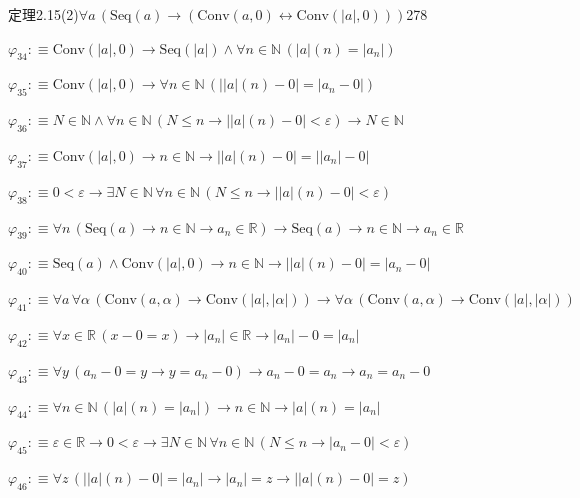 \begin{fullproof}{定理2.15(2)}{$\forall a\,(\mathrm{Seq}(a) \to (\mathrm{Conv}(a,0) \leftrightarrow \mathrm{Conv}(\lvert a \rvert,0)))$}{278}
\begin{abbrevlist}
\item $\varphi_{34} :\equiv \mathrm{Conv}(\lvert a \rvert,0) \to \mathrm{Seq}(\lvert a \rvert) \land \forall n \in \mathbb{N}\,(\lvert a \rvert(n) = \lvert a_{n} \rvert)$
\item $\varphi_{35} :\equiv \mathrm{Conv}(\lvert a \rvert,0) \to \forall n \in \mathbb{N}\,(\lvert \lvert a \rvert(n) - 0 \rvert = \lvert a_{n} - 0 \rvert)$
\item $\varphi_{36} :\equiv N \in \mathbb{N} \land \forall n \in \mathbb{N}\,(N \leq n \to \lvert \lvert a \rvert(n) - 0 \rvert < \varepsilon) \to N \in \mathbb{N}$
\item $\varphi_{37} :\equiv \mathrm{Conv}(\lvert a \rvert,0) \to n \in \mathbb{N} \to \lvert \lvert a \rvert(n) - 0 \rvert = \lvert \lvert a_{n} \rvert - 0 \rvert$
\item $\varphi_{38} :\equiv 0 < \varepsilon \to \exists N \in \mathbb{N}\,\forall n \in \mathbb{N}\,(N \leq n \to \lvert \lvert a \rvert(n) - 0 \rvert < \varepsilon)$
\item $\varphi_{39} :\equiv \forall n\,(\mathrm{Seq}(a) \to n \in \mathbb{N} \to a_{n} \in \mathbb{R}) \to \mathrm{Seq}(a) \to n \in \mathbb{N} \to a_{n} \in \mathbb{R}$
\item $\varphi_{40} :\equiv \mathrm{Seq}(a) \land \mathrm{Conv}(\lvert a \rvert,0) \to n \in \mathbb{N} \to \lvert \lvert a \rvert(n) - 0 \rvert = \lvert a_{n} - 0 \rvert$
\item $\varphi_{41} :\equiv \forall a\,\forall \alpha\,(\mathrm{Conv}(a,\alpha) \to \mathrm{Conv}(\lvert a \rvert,\lvert \alpha \rvert)) \to \forall \alpha\,(\mathrm{Conv}(a,\alpha) \to \mathrm{Conv}(\lvert a \rvert,\lvert \alpha \rvert))$
\item $\varphi_{42} :\equiv \forall x \in \mathbb{R}\,(x - 0 = x) \to \lvert a_{n} \rvert \in \mathbb{R} \to \lvert a_{n} \rvert - 0 = \lvert a_{n} \rvert$
\item $\varphi_{43} :\equiv \forall y\,(a_{n} - 0 = y \to y = a_{n} - 0) \to a_{n} - 0 = a_{n} \to a_{n} = a_{n} - 0$
\item $\varphi_{44} :\equiv \forall n \in \mathbb{N}\,(\lvert a \rvert(n) = \lvert a_{n} \rvert) \to n \in \mathbb{N} \to \lvert a \rvert(n) = \lvert a_{n} \rvert$
\item $\varphi_{45} :\equiv \varepsilon \in \mathbb{R} \to 0 < \varepsilon \to \exists N \in \mathbb{N}\,\forall n \in \mathbb{N}\,(N \leq n \to \lvert a_{n} - 0 \rvert < \varepsilon)$
\item $\varphi_{46} :\equiv \forall z\,(\lvert \lvert a \rvert(n) - 0 \rvert = \lvert a_{n} \rvert \to \lvert a_{n} \rvert = z \to \lvert \lvert a \rvert(n) - 0 \rvert = z)$

\end{abbrevlist}
\end{fullproof}
